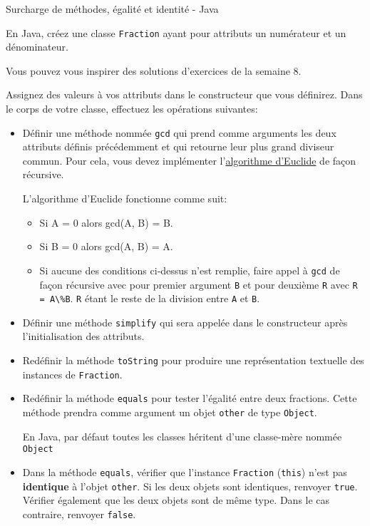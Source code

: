 \begin{Exercice}[30 minutes]{Surcharge de méthodes, égalité et identité - Java}

En Java, créez une classe \lstinline{Fraction} ayant pour attributs un numérateur et un dénominateur. 
\begin{conseil}
	Vous pouvez vous inspirer des solutions d'exercices de la semaine 8.
\end{conseil}
Assignez des valeurs à vos attributs dans le constructeur que vous définirez. Dans le corps de votre classe, effectuez les opérations suivantes:
\begin{itemize}
	\item Définir une méthode nommée \lstinline{gcd} qui prend comme arguments les deux attributs définis précédemment et qui retourne leur plus grand diviseur commun. Pour cela, vous devez implémenter l'\href{https://fr.wikipedia.org/wiki/Algorithme_d%27Euclide#:~:text=le%20code%5D-,Principe}{algorithme d'Euclide} de façon récursive.
	\begin{conseil}
		L'algorithme d'Euclide fonctionne comme suit:
		\begin{itemize}
			\item Si A = 0 alors gcd(A, B) = B.
			\item Si B = 0 alors gcd(A, B) = A.
			\item Si aucune des conditions ci-dessus n'est remplie, faire appel à \lstinline{gcd} de façon récursive avec pour premier argument \lstinline{B} et pour deuxième \lstinline{R} avec \lstinline{R = A\%B}. \lstinline{R} étant le reste de la division entre \lstinline{A} et \lstinline{B}.
		\end{itemize}
	\end{conseil}
	\item Définir une méthode \lstinline{simplify} qui sera appelée dans le constructeur après l'initialisation des attributs. 
	\item Redéfinir la méthode \lstinline{toString} pour produire une représentation textuelle des instances de \lstinline{Fraction}.
	\item Redéfinir la méthode \lstinline{equals} pour tester l'égalité entre deux fractions. Cette méthode prendra comme argument un objet \lstinline{other} de type \lstinline{Object}.
	\begin{conseil}
		En Java, par défaut toutes les classes héritent d'une classe-mère nommée \lstinline{Object}
	\end{conseil}
	\item Dans la méthode \lstinline{equals}, vérifier que l'instance \lstinline{Fraction} (\lstinline{this}) n'est pas \textbf{identique} à l'objet \lstinline{other}. Si les deux objets sont identiques, renvoyer \lstinline{true}. Vérifier également que les deux objets sont de même type. Dans le cas contraire, renvoyer \lstinline{false}.

\end{itemize}
\end{Exercice}
